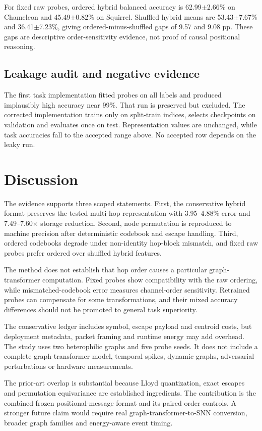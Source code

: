 \documentclass{article}
\begin{document}
For fixed raw probes, ordered hybrid balanced accuracy is 62.99$\pm$2.66\% on Chameleon and 45.49$\pm$0.82\% on Squirrel. Shuffled hybrid means are 53.43$\pm$7.67\% and 36.41$\pm$7.23\%, giving ordered-minus-shuffled gaps of 9.57 and 9.08 pp. These gaps are descriptive order-sensitivity evidence, not proof of causal positional reasoning.

\subsection{Leakage audit and negative evidence}


The first task implementation fitted probes on all labels and produced implausibly high accuracy near 99\%. That run is preserved but excluded. The corrected implementation trains only on split-train indices, selects checkpoints on validation and evaluates once on test. Representation values are unchanged, while task accuracies fall to the accepted range above. No accepted row depends on the leaky run.

\section{Discussion}


The evidence supports three scoped statements. First, the conservative hybrid format preserves the tested multi-hop representation with 3.95--4.88\% error and 7.49--7.60$\times$ storage reduction. Second, node permutation is reproduced to machine precision after deterministic codebook and escape handling. Third, ordered codebooks degrade under non-identity hop-block mismatch, and fixed raw probes prefer ordered over shuffled hybrid features.

The method does not establish that hop order causes a particular graph-transformer computation. Fixed probes show compatibility with the raw ordering, while mismatched-codebook error measures channel-order sensitivity. Retrained probes can compensate for some transformations, and their mixed accuracy differences should not be promoted to general task superiority.

The conservative ledger includes symbol, escape payload and centroid costs, but deployment metadata, packet framing and runtime energy may add overhead. The study uses two heterophilic graphs and five probe seeds. It does not include a complete graph-transformer model, temporal spikes, dynamic graphs, adversarial perturbations or hardware measurements.

The prior-art overlap is substantial because Lloyd quantization, exact escapes and permutation equivariance are established ingredients. The contribution is the combined frozen positional-message format and its paired order controls. A stronger future claim would require real graph-transformer-to-SNN conversion, broader graph families and energy-aware event timing.
\end{document}
